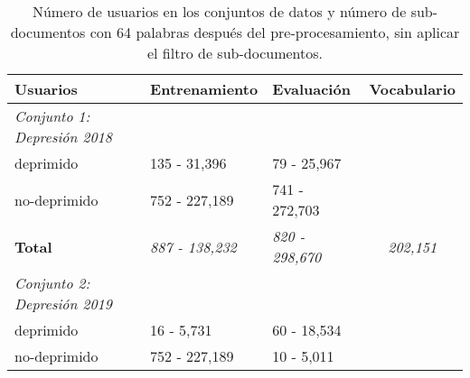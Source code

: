 \begin{table}[!hbt]
\caption{Número de usuarios en los conjuntos de datos y número de sub-documentos con 64 palabras después del pre-procesamiento, sin aplicar el filtro de sub-documentos.} \label{table:orginal_users}
\begin{center}

\begin{tabular}{llll}
\hline
\rowcolor[HTML]{FFFFFF} 
\textbf{Usuarios}                                           & \textbf{Entrenamiento}                       & \textbf{Evaluación}                          & \textbf{Vocabulario}                                         \\ \hline
\rowcolor[HTML]{EFEFEF} 
\textit{Conjunto 1: Depresión 2018}                         & \multicolumn{1}{c}{\cellcolor[HTML]{EFEFEF}} & \multicolumn{1}{c}{\cellcolor[HTML]{EFEFEF}} &                                                              \\ \hline
\rowcolor[HTML]{FFFFFF} 
deprimido                                                   & 135 - 31,396                                 & 79 - 25,967                                  &                                                              \\ \hline
\rowcolor[HTML]{FFFFFF} 
no-deprimido                                                & 752 - 227,189                                & 741 - 272,703                                &                                                              \\ \hline
\rowcolor[HTML]{FFFFFF} 
\textbf{Total}                                              & \textit{887 - 138,232}                       & \textit{820 - 298,670}                       & \multicolumn{1}{c}{\cellcolor[HTML]{FFFFFF}\textit{202,151}} \\ \hline
\rowcolor[HTML]{EFEFEF} 
\cellcolor[HTML]{EFEFEF}\textit{Conjunto 2: Depresión 2019} &                                              &                                              &                                                              \\ \hline
\rowcolor[HTML]{FFFFFF} 
deprimido                                                   & 16 - 5,731                                   & 60 - 18,534                                  &                                                              \\ \hline
\rowcolor[HTML]{FFFFFF} 
no-deprimido                                                & 752 - 227,189                                & 10 - 5,011                                   &                                                              \\ \hline

\end{tabular}
\end{center}
\end{table}
